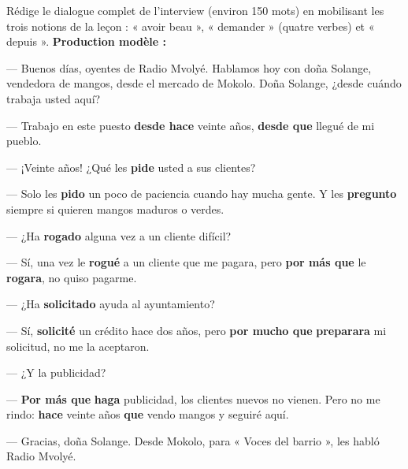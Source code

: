 \documentclass[11pt]{article}
\begin{document}
\begin{exoresolu}
Rédige le dialogue complet de l'interview (environ 150 mots) en mobilisant les trois notions de la leçon : « avoir beau », « demander » (quatre verbes) et « depuis ».
\tcblower
\textbf{Production modèle :}

\begin{textebox}
— Buenos días, oyentes de Radio Mvolyé. Hablamos hoy con doña Solange, vendedora de mangos, desde el mercado de Mokolo. Doña Solange, ¿desde cuándo trabaja usted aquí?\par
— Trabajo en este puesto \textbf{desde hace} veinte años, \textbf{desde que} llegué de mi pueblo.\par
— ¡Veinte años! ¿Qué les \textbf{pide} usted a sus clientes?\par
— Solo les \textbf{pido} un poco de paciencia cuando hay mucha gente. Y les \textbf{pregunto} siempre si quieren mangos maduros o verdes.\par
— ¿Ha \textbf{rogado} alguna vez a un cliente difícil?\par
— Sí, una vez le \textbf{rogué} a un cliente que me pagara, pero \textbf{por más que} le \textbf{rogara}, no quiso pagarme.\par
— ¿Ha \textbf{solicitado} ayuda al ayuntamiento?\par
— Sí, \textbf{solicité} un crédito hace dos años, pero \textbf{por mucho que} \textbf{preparara} mi solicitud, no me la aceptaron.\par
— ¿Y la publicidad?\par
— \textbf{Por más que} \textbf{haga} publicidad, los clientes nuevos no vienen. Pero no me rindo: \textbf{hace} veinte años \textbf{que} vendo mangos y seguiré aquí.\par
— Gracias, doña Solange. Desde Mokolo, para « Voces del barrio », les habló Radio Mvolyé.
\end{textebox}


\end{exoresolu}
\end{document}
